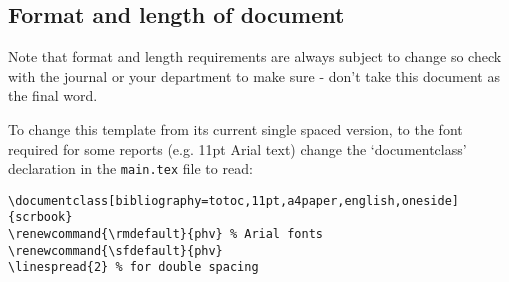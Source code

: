 \subsection{Format and length of document}
\label{sec:length}

Note that format and length requirements are always subject to change so check with the journal 
or your department
to make sure - don't take this document as the final word.

To change this template from its current single spaced version, 
to the font required for some reports (e.g. 11pt Arial text) change the 
`documentclass' declaration in the  \verb|main.tex| file to read:

\begin{verbatim}
\documentclass[bibliography=totoc,11pt,a4paper,english,oneside]{scrbook}
\renewcommand{\rmdefault}{phv} % Arial fonts
\renewcommand{\sfdefault}{phv}
\linespread{2} % for double spacing
\end{verbatim}

